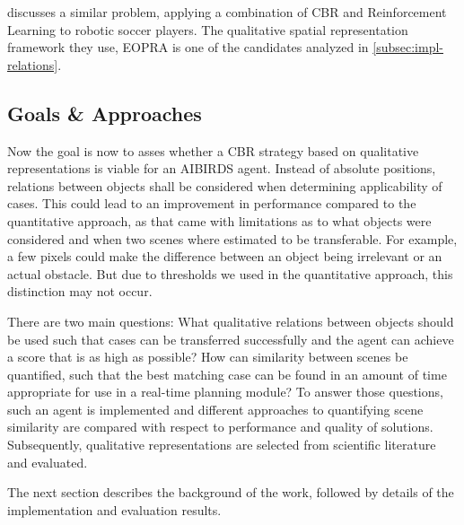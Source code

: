 \cite{QCBR} discusses a similar problem, applying a combination of \ac{CBR} and Reinforcement Learning to robotic soccer players.
The qualitative spatial representation framework they use, \ac{EOPRA} is one of the candidates analyzed in \ref{subsec:impl-relations}.

\subsection{Goals \& Approaches}
Now the goal is now to asses whether a \ac{CBR} strategy based on qualitative  representations is viable for an AIBIRDS agent.
Instead of absolute positions, relations between objects shall be considered when determining applicability of cases.
This could lead to an improvement in performance compared to the quantitative approach, as that came with limitations as to what objects were considered and when two scenes where estimated to be transferable. For example, a few pixels could make the difference between an object being irrelevant or an actual obstacle.
But due to thresholds we used in the quantitative approach, this distinction may not occur.

There are two main questions: What qualitative relations between objects should be used such that cases can be transferred successfully and the agent can achieve a score that is as high as possible?
How can similarity between scenes be quantified, such that the best matching case can be found in an amount of time appropriate for use in a real-time planning module?
To answer those questions, such an agent is implemented and different approaches to quantifying scene similarity are compared with respect to performance and quality of solutions. Subsequently, qualitative representations are selected from scientific literature and evaluated.


The next section describes the background of the work, followed by details of the implementation and evaluation results.
